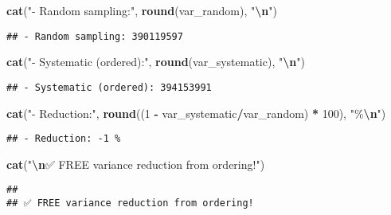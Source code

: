 \documentclass[
]{article}
\newenvironment{Shaded}{\begin{snugshade}}{\end{snugshade}}
\newcommand{\DecValTok}[1]{\textcolor[rgb]{0.00,0.00,0.81}{#1}}
\newcommand{\FunctionTok}[1]{\textcolor[rgb]{0.13,0.29,0.53}{\textbf{#1}}}
\newcommand{\NormalTok}[1]{#1}
\newcommand{\SpecialCharTok}[1]{\textcolor[rgb]{0.81,0.36,0.00}{\textbf{#1}}}
\newcommand{\StringTok}[1]{\textcolor[rgb]{0.31,0.60,0.02}{#1}}
\begin{document}
\begin{Shaded}
\begin{Highlighting}[]
\FunctionTok{cat}\NormalTok{(}\StringTok{"{-} Random sampling:"}\NormalTok{, }\FunctionTok{round}\NormalTok{(var\_random), }\StringTok{"}\SpecialCharTok{\textbackslash{}n}\StringTok{"}\NormalTok{)}
\end{Highlighting}
\end{Shaded}

\begin{verbatim}
## - Random sampling: 390119597
\end{verbatim}

\begin{Shaded}
\begin{Highlighting}[]
\FunctionTok{cat}\NormalTok{(}\StringTok{"{-} Systematic (ordered):"}\NormalTok{, }\FunctionTok{round}\NormalTok{(var\_systematic), }\StringTok{"}\SpecialCharTok{\textbackslash{}n}\StringTok{"}\NormalTok{)}
\end{Highlighting}
\end{Shaded}

\begin{verbatim}
## - Systematic (ordered): 394153991
\end{verbatim}

\begin{Shaded}
\begin{Highlighting}[]
\FunctionTok{cat}\NormalTok{(}\StringTok{"{-} Reduction:"}\NormalTok{, }\FunctionTok{round}\NormalTok{((}\DecValTok{1} \SpecialCharTok{{-}}\NormalTok{ var\_systematic}\SpecialCharTok{/}\NormalTok{var\_random) }\SpecialCharTok{*} \DecValTok{100}\NormalTok{), }\StringTok{"\%}\SpecialCharTok{\textbackslash{}n}\StringTok{"}\NormalTok{)}
\end{Highlighting}
\end{Shaded}

\begin{verbatim}
## - Reduction: -1 %
\end{verbatim}

\begin{Shaded}
\begin{Highlighting}[]
\FunctionTok{cat}\NormalTok{(}\StringTok{"}\SpecialCharTok{\textbackslash{}n}\StringTok{✅ FREE variance reduction from ordering!"}\NormalTok{)}
\end{Highlighting}
\end{Shaded}

\begin{verbatim}
## 
## ✅ FREE variance reduction from ordering!
\end{verbatim}
\end{document}
